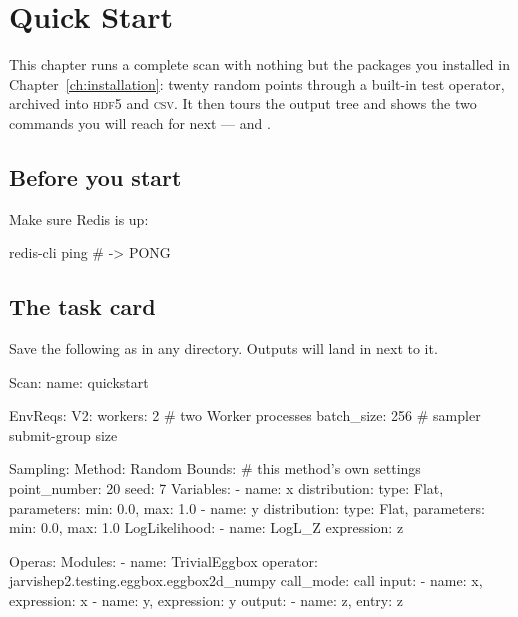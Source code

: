 \chapter{Quick Start}
\label{ch:quickstart}

 This chapter runs a complete scan with
nothing but the packages you installed in Chapter~\ref{ch:installation}: twenty random
points through a built-in test operator, archived into \textsc{hdf5} and \textsc{csv}. It
then tours the output tree and shows the two commands you will reach for next ---
 and .

\section{Before you start}

Make sure Redis is up:

\begin{terminal}
\begin{jcmd}
redis-cli ping        # -> PONG
\end{jcmd}
\end{terminal}

\section{The task card}
\label{sec:quickstart-card}

Save the following as  in any directory. Outputs will land in
 next to it.

\begin{yamlwin}
Scan:
  name: quickstart

EnvReqs:
  V2:
    workers: 2                # two Worker processes
    batch_size: 256           # sampler submit-group size

Sampling:
  Method: Random
  Bounds:                     # this method's own settings
    point_number: 20
    seed: 7
  Variables:
    - name: x
      distribution: {type: Flat, parameters: {min: 0.0, max: 1.0}}
    - name: y
      distribution: {type: Flat, parameters: {min: 0.0, max: 1.0}}
  LogLikelihood:
    - name: LogL_Z
      expression: z

Operas:
  Modules:
    - name: TrivialEggbox
      operator: jarvishep2.testing.eggbox.eggbox2d_numpy
      call_mode: call
      input:
        - {name: x, expression: x}
        - {name: y, expression: y}
      output:
        - {name: z, entry: z}
\end{yamlwin}

